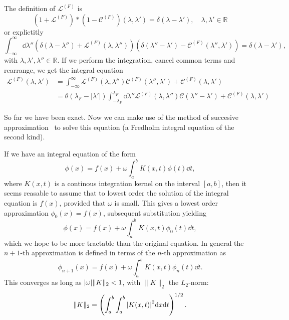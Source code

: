 \documentclass[11pt, a4paper]{report} %
\newcommand{\inversetruncc}{\mathcal{L}}
\newcommand{\kernel}{\mathcal{C}}
\begin{document}
The definition of \(\inversetruncc^{(F)}\) is~\cite{tofind}
\begin{equation}
	\left(1 + \inversetruncc^{(F)}\right) * \left(1 - \kernel^{(F)}\right)(\lambda,\lambda')=\delta(\lambda-\lambda'), \quad \lambda, \lambda' \in \mathbb{R}
\end{equation}
or explictitly
\begin{equation}
	\int_{-\infty}^{\infty} \dd \lambda'' \left( \delta(\lambda-\lambda'') + \inversetruncc^{(F)}(\lambda,\lambda'')\right)\left(\delta(\lambda''-\lambda') - \kernel^{(F)}(\lambda'',\lambda')\right) = \delta(\lambda-\lambda'),
\end{equation}
with  \(\lambda, \lambda', \lambda'' \in \mathbb{R}\).
If we perform the integration, cancel common terms and rearrange, we get the integral equation
\begin{align}
	\inversetruncc^{(F)}(\lambda,\lambda') &= \int_{-\infty}^{\infty} \inversetruncc^{(F)}(\lambda,\lambda'') \kernel^{(F)}(\lambda'',\lambda') + \kernel^{(F)}(\lambda,\lambda')\\
	&= \theta(\lambda_F - \lvert\lambda'\rvert) \int_{-\lambda_F}^{\lambda_F} \dd \lambda'' \inversetruncc^{(F)}(\lambda,\lambda'') \kernel(\lambda''-\lambda') + \kernel^{(F)}(\lambda,\lambda')
\end{align}

So far we have been exact.
Now we can make use of the method of succesive approximation~\cite{Zemyan2012} to solve this equation (a Fredholm integral equation of the second kind).

If we have an integral equation of the form
\begin{equation}
  \phi(x) = f(x) + \omega \int_{a}^b K(x,t)\phi(t) \dd t,
\end{equation}
where $K(x,t)$ is a continous integration kernel on the interval $[a,b]$, then it seems reasable to assume that to lowest order the solution of the integral equation is $f(x)$, provided that $\omega$ is small.
This gives a lowest order approximation $\phi_0(x) = f(x)$, subsequent substitution yielding 
\begin{equation}
  \phi(x) = f(x) + \omega \int_{a}^b K(x,t)\phi_0(t) \dd t,
\end{equation}
which we hope to be more tractable than the original equation.
In general the $n+1$-th approximation is defined in terms of the $n$-th approximation as
\begin{equation}
  \phi_{n+1}(x) = f(x) + \omega \int_{a}^b K(x,t)\phi_n(t) \dd t.
\end{equation}
This converges as long as $\abs{\omega} \lVert K \rVert_2 < 1$, with $\lVert K \rVert_2$ the $L_2$-norm:
\begin{equation}
  \lVert K \rVert_2 = \left( \int_{a}^b \int_a^b \abs{K(x,t)}^2 \dd x \dd t\right)^{1/2}.
\end{equation}
\end{document}

